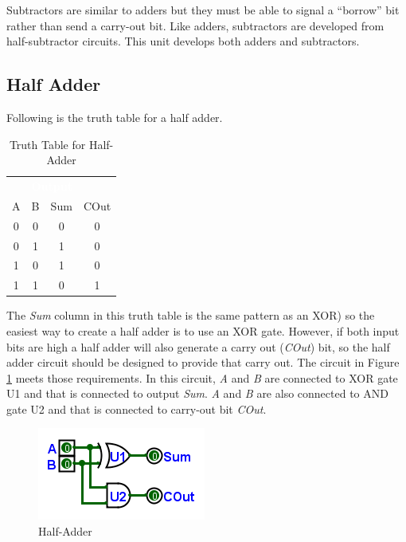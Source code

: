 Subtractors are similar to adders but they must be able to signal a ``borrow'' bit rather than send a carry-out bit. Like adders, subtractors are developed from half-subtractor circuits. This unit develops both adders and subtractors.

\subsection{Half Adder}
\label{CL:subsec:half_adder}

Following is the truth table for a half adder.

\begin{table}[H]
  \sffamily
  \newcommand{\head}[1]{\textcolor{white}{\textbf{#1}}}    
  \begin{center}
    \begin{tabular}{cc|cc} 
      \rowcolor{black!75}
      \multicolumn{2}{c}{\head{Inputs}} & \multicolumn{2}{c}{\head{Output}} \\
      A & B & Sum & COut \\
      \hline
      0 & 0 & 0 & 0 \\
      0 & 1 & 1 & 0 \\
      1 & 0 & 1 & 0 \\
      1 & 1 & 0 & 1 
    \end{tabular}
  \end{center}
  \caption{Truth Table for Half-Adder}
  \label{CL:tab:truth_table_for_half_adder}
\end{table}

The \emph{Sum} column in this truth table is the same pattern as an \textsf{XOR}) so the easiest way to create a half adder is to use an \textsf{XOR} gate. However, if both input bits are high a half adder will also generate a carry out (\emph{COut}) bit, so the half adder circuit should be designed to provide that carry out. The circuit in Figure \ref{fig:08_05} meets those requirements. In this circuit, \emph{A} and \emph{B} are connected to \textsf{XOR} gate \textsf{U1} and that is connected to output \emph{Sum}. \emph{A} and \emph{B} are also connected to \textsf{AND} gate \textsf{U2} and that is connected to carry-out bit \emph{COut}.

\begin{figure}[H]
	\centering
	\includegraphics[width=\maxwidth{.95\linewidth}]{gfx/08_05}
	\caption{Half-Adder}
	\label{fig:08_05}
\end{figure}

